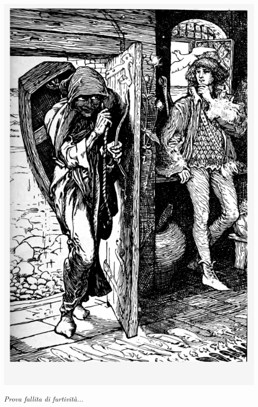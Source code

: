 \begin{center}
\includegraphics[width=0.45\linewidth]{immagini/attaccoallespalle.png}

\emph{Prova fallita di furtività...}
\end{center}

\pagebreak

